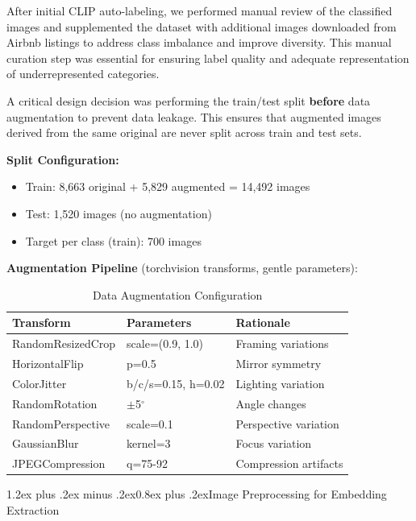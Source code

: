 \documentclass[conference]{IEEEtran}
\makeatletter
\renewcommand{\subsection}{\@startsection{subsection}{2}{\z@}%
  {1.2ex plus .2ex minus .2ex}{0.8ex plus .2ex}{\normalfont\bfseries}}
\makeatother
\begin{document}
After initial CLIP auto-labeling, we performed manual review of the classified images and supplemented the dataset with additional images downloaded from Airbnb listings to address class imbalance and improve diversity. This manual curation step was essential for ensuring label quality and adequate representation of underrepresented categories.

A critical design decision was performing the train/test split \textbf{before} data augmentation to prevent data leakage. This ensures that augmented images derived from the same original are never split across train and test sets.

\textbf{Split Configuration:}
\begin{itemize}
\item Train: 8,663 original + 5,829 augmented = 14,492 images
\item Test: 1,520 images (no augmentation)
\item Target per class (train): 700 images
\end{itemize}

\textbf{Augmentation Pipeline} (torchvision transforms, gentle parameters):

\begin{table}[htbp]
\caption{Data Augmentation Configuration}
\begin{center}
\begin{tabular}{@{}lll@{}}
\toprule
\textbf{Transform} & \textbf{Parameters} & \textbf{Rationale} \\
\midrule
RandomResizedCrop & scale=(0.9, 1.0) & Framing variations \\
HorizontalFlip & p=0.5 & Mirror symmetry \\
ColorJitter & b/c/s=0.15, h=0.02 & Lighting variation \\
RandomRotation & $\pm$5$^\circ$ & Angle changes \\
RandomPerspective & scale=0.1 & Perspective variation \\
GaussianBlur & kernel=3 & Focus variation \\
JPEGCompression & q=75-92 & Compression artifacts \\
\bottomrule
\end{tabular}
\label{tab:augmentation}
\end{center}
\end{table}

\subsection{Image Preprocessing for Embedding Extraction}
\end{document}

